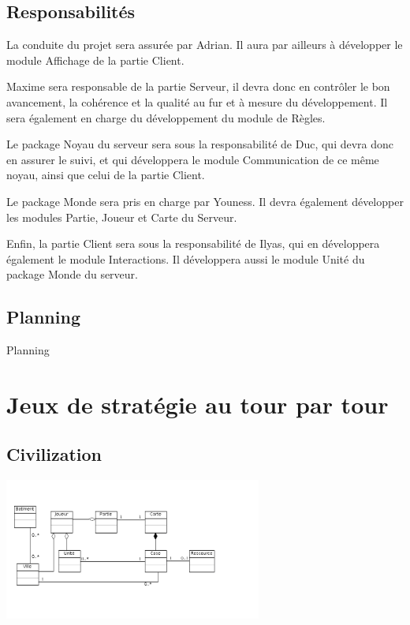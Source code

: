 \documentclass[a4paper,10pt]{report}
\begin{document}
    \section{Responsabilités}
    
      La conduite du projet sera assurée par Adrian. Il aura par ailleurs à développer le module Affichage de la partie Client. 
      
      Maxime sera responsable de la partie Serveur, il devra donc en contrôler le bon avancement, la cohérence et la qualité au fur et à mesure du développement. Il sera également en charge du développement du module de Règles. 
      
      Le package Noyau du serveur sera sous la responsabilité de Duc, qui devra donc en assurer le suivi, et qui développera le module Communication de ce même noyau, ainsi que celui de la partie Client. 
      
      Le package Monde sera pris en charge par Youness. Il devra également développer les modules Partie, Joueur et Carte du Serveur. 
      
      Enfin, la partie Client sera sous la responsabilité de Ilyas, qui en développera également le module Interactions. Il développera aussi le module Unité du package Monde du serveur. 


    \section{Planning}

      Planning


\appendix

\chapter{Jeux de stratégie au tour par tour}

	\section{Civilization}

		\includegraphics[width=320px]{diagrammes/concept_civilization.png}
\end{document}
